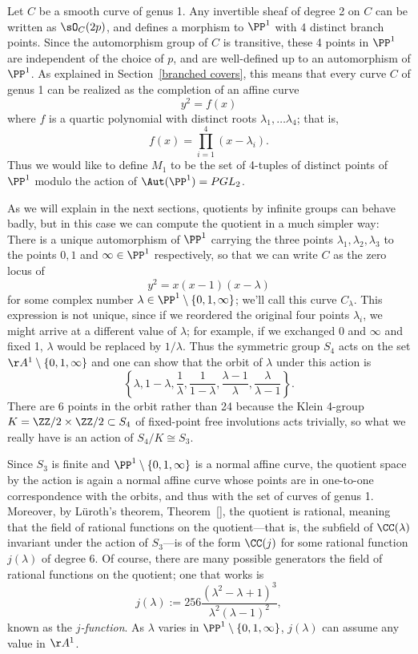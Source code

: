Let $C$ be a smooth curve of genus 1. Any invertible sheaf of degree 2 on $C$ can be written as
$\sO_C(2p)$, and defines
a morphism to $\PP^1$ with 4 distinct branch points. Since the automorphism group of $C$ is transitive,
these 4 points in $\PP^1$ are independent of the choice of $p$, and are well-defined
up to an automorphism of $\PP^1$.    As explained in Section~\ref{branched covers},  this means that every curve $C$ of genus 1 can be realized as the completion of an affine curve
$$
y^2 = f(x)
$$
where $f$ is a quartic polynomial with distinct roots $\lambda_1, \dots \lambda_4$; that is, 
$$
f(x) = \prod_{i=1}^4 (x - \lambda_i).
$$
Thus we would like to define $M_1$ to be the set of 4-tuples of distinct points of $\PP^1$ modulo the action of $\Aut(\PP^1) = PGL_2$.

As we will explain in the next sections, quotients by infinite groups can behave badly,
but in this case we can compute the quotient in a much simpler way:
There is a unique automorphism of $\PP^1$ carrying the three points $\lambda_1, \lambda_2,\lambda_3$ to the points $0, 1$ and $\infty \in \PP^1$ respectively, so that we can write $C$ as the zero locus of
$$
y^2 = x(x-1)(x-\lambda)
$$
for some complex number $\lambda  \in \PP^1 \setminus \{0,1,\infty\}$; we'll call this curve $C_\lambda$. 
This expression is not unique, since if we reordered the original  four points $\lambda_i$, we might arrive at a different value of $\lambda$; for example, if we exchanged 0 and $\infty$ and fixed 1, $\lambda$ would be replaced by $1/\lambda$. Thus the symmetric group $S_4$ acts on the set $\AA^1 \setminus \{0,1,\infty\}$
and one can show that the orbit of $\lambda$ under this action is
$$
 \left\{ \lambda, 1-\lambda, \frac{1}{\lambda}, \frac{1}{1-\lambda}, \frac{\lambda-1}{\lambda}, \frac{\lambda}{\lambda - 1} \right\}.
$$
There are 6 points in the orbit rather than 24 because the Klein 4-group
$K = \ZZ/2\times \ZZ/2 \subset S_4$ of fixed-point free involutions acts trivially, so what we really have is an action of $S_4/K \cong S_3$.

Since $S_3$ is finite and $\PP^1 \setminus \{0,1,\infty\}$ is a normal affine curve, the quotient space by the action is again a normal affine curve whose points are in one-to-one
correspondence with the orbits, and thus with the set of curves of genus 1. 
 Moreover, by L\"uroth's theorem, Theorem~\ref{}, the quotient is rational, meaning that the field of rational functions on the quotient---that is, the subfield of $\CC(\lambda)$ invariant under the action of $S_3$---is of the form $\CC(j)$ for some rational function $j(\lambda)$ of degree 6. Of course, there are many possible generators the field of rational functions on the quotient; one that works is
\begin{equation}\label{formula for j}
j(\lambda) := 256\frac{(\lambda^2-\lambda + 1)^3}{\lambda^2(\lambda-1)^2},
\end{equation}
known as the \emph{$j$-function}. As $\lambda$ varies in $\PP^1 \setminus \{0,1,\infty\}$, $j(\lambda)$ can assume any value in $\AA^1$.
 
